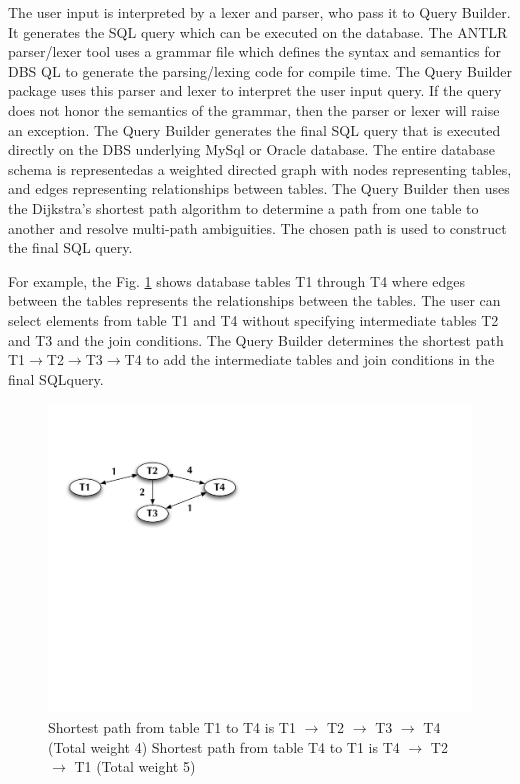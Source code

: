 \documentclass[a4paper]{jpconf}
\begin{document}
The user input is interpreted by a lexer and parser, who pass it to
Query Builder. It generates the SQL query which can be executed on 
the database. The ANTLR parser/lexer tool 
uses a grammar file which defines the syntax and semantics for 
DBS QL to generate the parsing/lexing code for compile time. 
The Query Builder package uses this parser and lexer to interpret 
the user input query. If the query does not honor the semantics of the 
grammar, then the parser or lexer will raise an exception. 
The Query Builder generates the final SQL query that is executed
directly on the DBS underlying MySql or Oracle database. 
The entire database schema is representedas a weighted
directed graph with nodes representing tables, and edges 
representing relationships between tables. The Query Builder
then uses the Dijkstra’s shortest path algorithm to determine a 
path from one table to another and resolve multi-path ambiguities.
The chosen path is used to construct the final SQL query. 


For example, the Fig. \ref{ShortestPath} shows database tables 
T1 through T4  where edges between the tables represents the 
relationships between the tables. The user can select elements
from table T1 and T4 without specifying intermediate tables T2 
and T3 and the join conditions. The Query Builder determines
the shortest path 
T1$\rightarrow$T2$\rightarrow$T3$\rightarrow$T4 
to add the intermediate tables 
and join conditions in the final SQLquery. 

\begin{figure}[htb]
\centering
\includegraphics[width=150mm]{DBSSql_shortestpath.pdf}
\caption{
Shortest path from table T1 to T4 is 
T1 $\rightarrow$ T2 $\rightarrow$ T3 $\rightarrow$ T4  (Total weight 4) 
Shortest path from table T4 to T1 is 
T4 $\rightarrow$ T2 $\rightarrow$ T1 (Total weight 5) 
}
\label{ShortestPath}
\end{figure}
\end{document}
